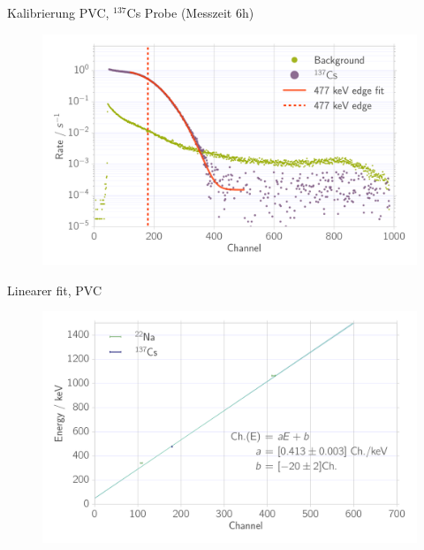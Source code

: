 \documentclass[xcolor=x11names,compress]{beamer}
\renewcommand{\(}{\begin{columns}}
\renewcommand{\)}{\end{columns}}
\newcommand{\<}[1]{\begin{column}{#1}}
\renewcommand{\>}{\end{column}}
\begin{document}
\begin{frame}[t]{Kalibrierung PVC, $^{137}$Cs Probe (Messzeit 6h) }
\begin{figure}[htpb]
\centering
\includegraphics[width=1.0\linewidth]{../analysis/figures/calib_ps_cs}
\label{fig:calib_ps_cs}
\end{figure}
\end{frame}

\begin{frame}[t]{Linearer fit, PVC}
\begin{figure}[htpb]
    \centering
    \includegraphics[width=1.0\linewidth]{../analysis/figures/calibration_ps_linear_fit}
\label{fig:calibration_ps_linear_fit}
\end{figure}
\end{frame}
\end{document}
